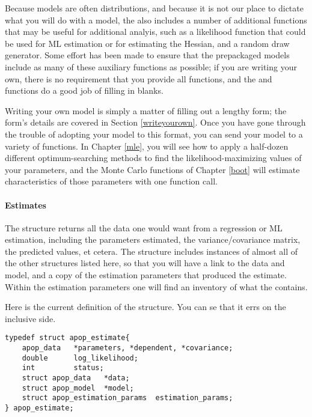 Because models are often distributions, and because it is not our place
to dictate what you will do with a model, the  also includes a
number of additional functions that may be useful for additional analyis,
such as a likelihood function that could be used for ML estimation or
for estimating the Hessian, and a random draw generator. Some effort
has been made to ensure that the prepackaged models include as many of
these auxiliary functions as possible; if you are writing your own,
there is no requirement that you provide all functions, and the  and 
functions do a good job of filling in blanks.

Writing your own model is simply a matter of filling out a lengthy form;
the form's details are covered in Section \ref{writeyourown}. Once you
have gone through the trouble of adopting your model to this format, you
can send your model to a variety of functions. In Chapter \ref{mle},
you will see how to apply a half-dozen different optimum-searching methods
to find the likelihood-maximizing values of your parameters, and the Monte
Carlo functions of Chapter \ref{boot} will estimate characteristics of
those parameters with one function call.

\paragraph{Estimates} 
The  structure returns all the data one would want
from a regression or ML estimation, including the parameters estimated,
the variance/covariance matrix, the predicted values, et cetera. The structure
includes instances of almost all of the other structures listed here, so
that you will have a link to the data and model, and a copy of the
estimation parameters that produced the estimate. Within the
estimation parameters one will find an inventory of
what the  contains.

Here is the current definition of the  structure. You can se that it errs on the inclusive side.
\begin{lstlisting}
typedef struct apop_estimate{
    apop_data   *parameters, *dependent, *covariance;
    double      log_likelihood;
    int         status;
    struct apop_data   *data;
    struct apop_model  *model;
    struct apop_estimation_params  estimation_params;
} apop_estimate;
\end{lstlisting}

